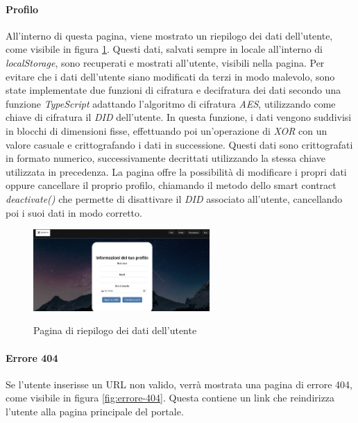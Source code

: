 \newpage
\paragraph{Profilo}

All'interno di questa pagina, viene mostrato un riepilogo dei dati dell'utente, come visibile in figura \ref{fig:profilo}.
Questi dati, salvati sempre in locale all'interno di \textit{localStorage}, sono recuperati e mostrati all'utente, visibili nella pagina.
Per evitare che i dati dell'utente siano modificati da terzi in modo malevolo, sono state implementate due funzioni di cifratura e decifratura 
dei dati secondo una funzione \textit{TypeScript} adattando l'algoritmo di cifratura \textit{AES}, utilizzando come chiave di cifratura il \textit{DID} dell'utente.
In questa funzione, i dati vengono suddivisi in blocchi di dimensioni fisse, effettuando poi un'operazione di \textit{XOR} con un valore casuale e crittografando i dati in successione.
Questi dati sono crittografati in formato numerico, successivamente decrittati utilizzando la stessa chiave utilizzata in precedenza.
La pagina offre la possibilità di modificare i propri dati oppure cancellare il proprio profilo, chiamando il metodo dello smart contract \textit{deactivate()}
che permette di disattivare il \textit{DID} associato all'utente, cancellando poi i suoi dati in modo corretto.
\begin{figure}[h]
    \centering
    \includegraphics[width=0.6\textwidth, alt={Schermata della pagina di riepilogo dei dati dell'utente}]{immagini/frontend/account.png}
    \caption{Pagina di riepilogo dei dati dell'utente}\label{fig:profilo}
\end{figure}

\paragraph{Errore 404}

Se l'utente inserisse un URL non valido, verrà mostrata una pagina di errore 404, come visibile in figura \ref{fig:errore-404}.
Questa contiene un link che reindirizza l'utente alla pagina principale del portale.


